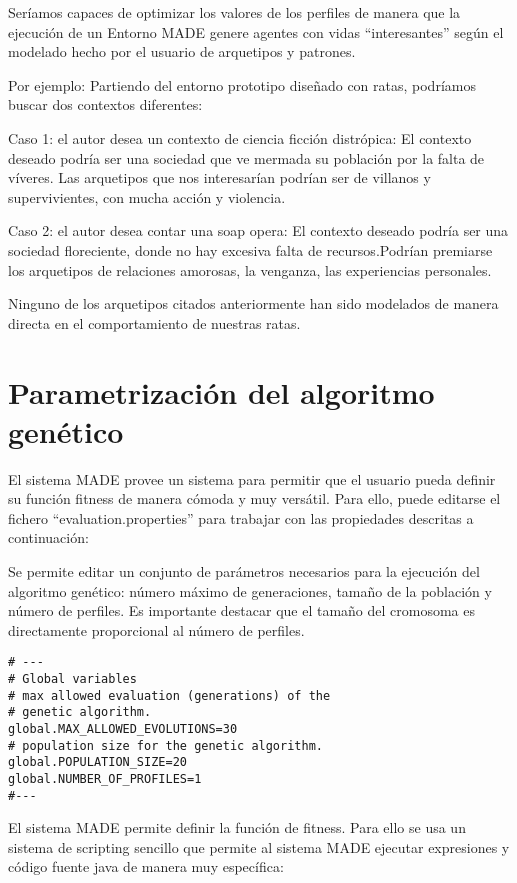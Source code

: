   

Seríamos capaces de optimizar los valores de los perfiles de manera que la
ejecución de un Entorno MADE genere agentes con vidas ``interesantes'' según el
modelado hecho por el usuario de arquetipos y patrones.

Por ejemplo: Partiendo del entorno prototipo diseñado con ratas, podríamos
buscar dos contextos diferentes:

Caso 1: el autor desea un contexto de ciencia ficción distrópica:
El contexto deseado podría ser una sociedad que ve mermada su población por la
falta de víveres. Las arquetipos que nos interesarían podrían ser de villanos y
supervivientes, con mucha acción y violencia.

Caso 2: el autor desea contar una soap opera:
El contexto deseado podría ser una sociedad floreciente, donde no hay
excesiva falta de recursos.Podrían premiarse los arquetipos de relaciones
amorosas, la venganza, las experiencias personales.

Ninguno de los arquetipos citados anteriormente han sido modelados de manera
directa en el comportamiento de nuestras ratas.


\section{Parametrización del algoritmo genético}

El sistema MADE provee un sistema para permitir que el usuario pueda definir su
función fitness de manera cómoda y muy versátil. Para ello, puede editarse el
fichero ``evaluation.properties'' para trabajar con las propiedades descritas
a continuación:

Se permite editar un conjunto de parámetros
necesarios para la ejecución del algoritmo genético: número máximo de
generaciones, tamaño de la población y número de perfiles. Es importante
destacar que el tamaño del cromosoma es directamente proporcional al número de
perfiles.

\begin{verbatim}
# ---
# Global variables
# max allowed evaluation (generations) of the 
# genetic algorithm.
global.MAX_ALLOWED_EVOLUTIONS=30
# population size for the genetic algorithm.
global.POPULATION_SIZE=20
global.NUMBER_OF_PROFILES=1
#---
\end{verbatim}


El sistema MADE permite definir la función de fitness. Para ello se usa un
sistema de scripting sencillo que permite al sistema MADE ejecutar expresiones y
código fuente java de manera muy específica:

